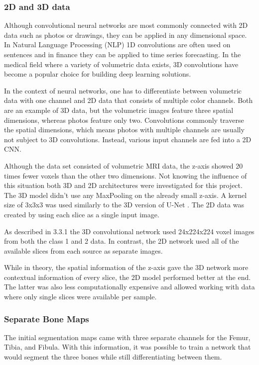 \subsubsection{2D and 3D data}

Although convolutional neural networks are most commonly connected with 2D data such as photos or drawings, they can be applied in any dimensional space. In Natural Language Processing (NLP) 1D convolutions are often used on sentences and in finance they can be applied to time series forecasting. In the medical field where a variety of volumetric data exists, 3D convolutions have become a popular choice for building deep learning solutions.

In the context of neural networks, one has to differentiate between volumetric data with one channel and 2D data that consists of multiple color channels. Both are an example of 3D data, but the volumetric images feature three spatial dimensions, whereas photos feature only two. Convolutions commonly traverse the spatial dimensions, which means photos with multiple channels are usually not subject to 3D convolutions. Instead, various input channels are fed into a 2D CNN.

Although the data set consisted of volumetric MRI data, the z-axis showed 20 times fewer voxels than the other two dimensions. Not knowing the influence of this situation both 3D and 2D architectures were investigated for this project. The 3D model didn't use any MaxPooling on the already small z-axis. A kernel size of 3x3x3 was used similarly to the 3D version of U-Net \cite{Cicek2016}. The 2D data was created by using each slice as a single input image.

As described in 3.3.1 the 3D convolutional network used 24x224x224 voxel images from both the class 1 and 2 data. In contrast, the 2D network used all of the available slices from each source as separate images.

While in theory, the spatial information of the z-axis gave the 3D network more contextual information of every slice, the 2D model performed better at the end. The latter was also less computationally expensive and allowed working with data where only single slices were available per sample.

\subsubsection{Separate Bone Maps}

The initial segmentation maps came with three separate channels for the Femur, Tibia, and Fibula. With this information, it was possible to train a network that would segment the three bones while still differentiating between them.

